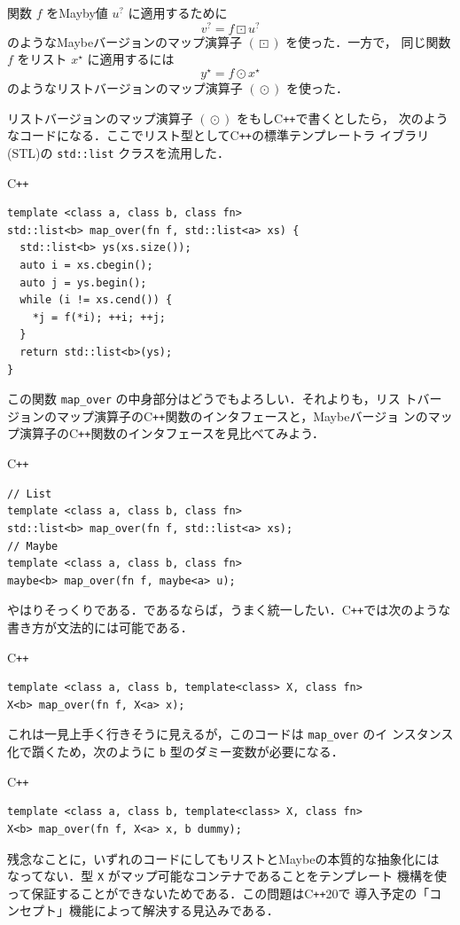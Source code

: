 \documentclass[a5paper,twoside,fleqn,draft]{jsbook}
\newcommand{\programminglanguage}[1]{\textsf{#1}}
\newcommand{\cxx}{\programminglanguage{C}\texttt{++}}
\newcommand{\cxxtwelve}{\cxx\programminglanguage{20}}
\newcommand{\code}[1]{\texttt{#1}}
\newenvironment{cxxcode}{\begin{itembox}[r]{\cxx}}{\end{itembox}}
\DeclareMathOperator{\mMapList}{\odot}
\DeclareMathOperator{\mMapMaybe}{\boxdot}
\newcommand{\mList}[1]{{#1}^\mathrm{\star}}
\newcommand{\mMaybe}[1]{{#1}^?}
\begin{document}
関数 $f$ をMayby値 $\mMaybe{u}$ に適用するために
\begin{equation}
  \mMaybe{v}
  =f\mMapMaybe\mMaybe{u}
\end{equation}
のようなMaybeバージョンのマップ演算子 $(\mMapMaybe)$ を使った．一方で，
同じ関数 $f$ をリスト $\mList{x}$ に適用するには
\begin{equation}
  \mList{y}
  =f\mMapList\mList{x}
\end{equation}
のようなリストバージョンのマップ演算子 $(\mMapList)$ を使った．

リストバージョンのマップ演算子 $(\mMapList)$ をもし\cxx で書くとしたら，
次のようなコードになる．ここでリスト型として\cxx の標準テンプレートラ
イブラリ(STL)の \code{std::list} クラスを流用した．
\begin{cxxcode}
\begin{verbatim}
template <class a, class b, class fn>
std::list<b> map_over(fn f, std::list<a> xs) {
  std::list<b> ys(xs.size());
  auto i = xs.cbegin();
  auto j = ys.begin();
  while (i != xs.cend()) {
    *j = f(*i); ++i; ++j;
  }
  return std::list<b>(ys);
}
\end{verbatim}
\end{cxxcode}
この関数 \code{map\_over} の中身部分はどうでもよろしい．それよりも，リス
トバージョンのマップ演算子の\cxx 関数のインタフェースと，Maybeバージョ
ンのマップ演算子の\cxx 関数のインタフェースを見比べてみよう．
\begin{cxxcode}
\begin{verbatim}
// List
template <class a, class b, class fn>
std::list<b> map_over(fn f, std::list<a> xs);
// Maybe
template <class a, class b, class fn>
maybe<b> map_over(fn f, maybe<a> u);
\end{verbatim}
\end{cxxcode}
やはりそっくりである．であるならば，うまく統一したい．\cxx では次のような書き方が文法的には可能である．
\begin{cxxcode}
\begin{verbatim}
template <class a, class b, template<class> X, class fn>
X<b> map_over(fn f, X<a> x);
\end{verbatim}
\end{cxxcode}
これは一見上手く行きそうに見えるが，このコードは \code{map\_over} のイ
ンスタンス化で躓くため，次のように \code{b} 型のダミー変数が必要になる．
\begin{cxxcode}
\begin{verbatim}
template <class a, class b, template<class> X, class fn>
X<b> map_over(fn f, X<a> x, b dummy);
\end{verbatim}
\end{cxxcode}
残念なことに，いずれのコードにしてもリストとMaybeの本質的な抽象化には
なってない．型 \code{X} がマップ可能なコンテナであることをテンプレート
機構を使って保証することができないためである．この問題は\cxxtwelve で
導入予定の「コンセプト」機能によって解決する見込みである．
\end{document}
